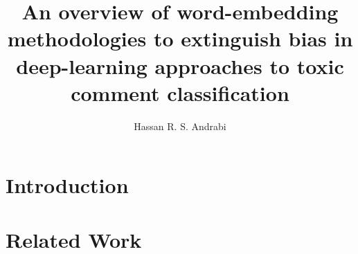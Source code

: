 \documentclass{article}
\title{An overview of word-embedding methodologies to extinguish bias in deep-learning approaches to toxic comment classification}
\author{Hassan R. S. Andrabi}
\date{}
\begin{document}
\maketitle

\begin{abstract}

\end{abstract}

\section{Introduction}\label{sec:introduction}


\section{Related Work}\label{sec:related-work}


\newpage



\end{document}
